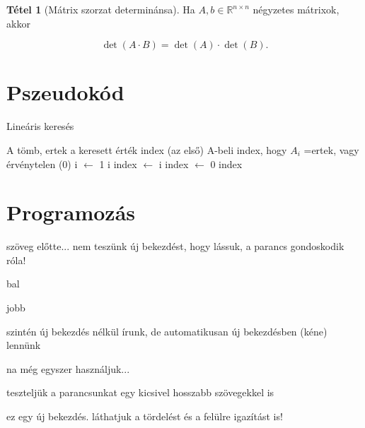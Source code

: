 \documentclass[twocolumn]{report}
\theoremstyle{definition}
\newtheorem{tet}{Tétel}
\newcommand{\centerpair}[2]{%
\par\noindent%
\begin{minipage}[t]{0.48\linewidth}%
\begin{flushright}%
#1%
\end{flushright}%
\end{minipage}%
\hfill\vline\hfill%
\begin{minipage}[t]{0.48\linewidth}%
\begin{flushleft}%
#2%
\end{flushleft}%
\end{minipage}%
\par}
\begin{document}
\begin{tet}[Mátrix szorzat determinánsa]
Ha $A, b \in \mathbb{R}^{n \times n} $ négyzetes mátrixok, akkor
\end{tet}

\begin{equation}
\det(A \cdot B)=\det(A) \cdot \det(B)\text{.}
\end{equation}

\chapter{Pszeudokód}

\hulipsum
\begin{algorithm}
\caption{Lineáris keresés}
\begin{algorithmic}[3]
\Require A tömb, ertek a keresett érték
\Ensure index (az első) A-beli index, hogy $A_i$ =ertek, vagy érvénytelen (0)
\State i $\gets$ 1
\State {}i
\EndWhile
{}
\State index $\gets$ i
\Else
\State index $\gets$ 0
\EndIf
\State \Return index
\EndProcedure
\end{algorithmic}
\end{algorithm}
\hulipsum

\chapter{Programozás}

szöveg előtte... nem teszünk új bekezdést, hogy lássuk, a parancs gondoskodik róla!
\centerpair{bal}{jobb}
szintén új bekezdés nélkül írunk, de automatikusan új bekezdésben (kéne) lennünk

\centerpair{na még egyszer használjuk...}{teszteljük a parancsunkat egy kicsivel hosszabb szövegekkel is\par ez egy új bekezdés. láthatjuk a tördelést és a felülre igazítást is!}
\end{document}
